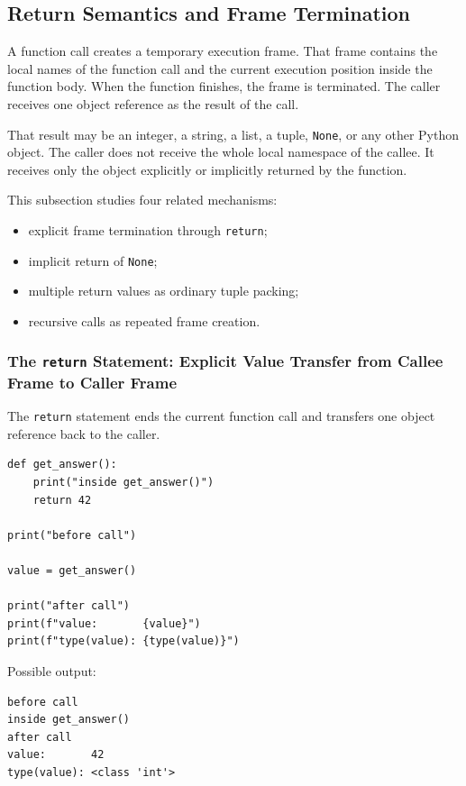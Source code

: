 \subsection{Return Semantics and Frame Termination}

A function call creates a temporary execution frame. That frame contains the local names of the function call and the current execution position inside the function body. When the function finishes, the frame is terminated. The caller receives one object reference as the result of the call.

That result may be an integer, a string, a list, a tuple, \texttt{None}, or any other Python object. The caller does not receive the whole local namespace of the callee. It receives only the object explicitly or implicitly returned by the function.

This subsection studies four related mechanisms:

\begin{itemize}
    \item explicit frame termination through \texttt{return};
    \item implicit return of \texttt{None};
    \item multiple return values as ordinary tuple packing;
    \item recursive calls as repeated frame creation.
\end{itemize}

\subsubsection{The \texttt{return} Statement: Explicit Value Transfer from Callee Frame to Caller Frame}

The \texttt{return} statement ends the current function call and transfers one object reference back to the caller.

\begin{verbatim}
def get_answer():
    print("inside get_answer()")
    return 42

print("before call")

value = get_answer()

print("after call")
print(f"value:       {value}")
print(f"type(value): {type(value)}")
\end{verbatim}

Possible output:

\begin{verbatim}
before call
inside get_answer()
after call
value:       42
type(value): <class 'int'>
\end{verbatim}


